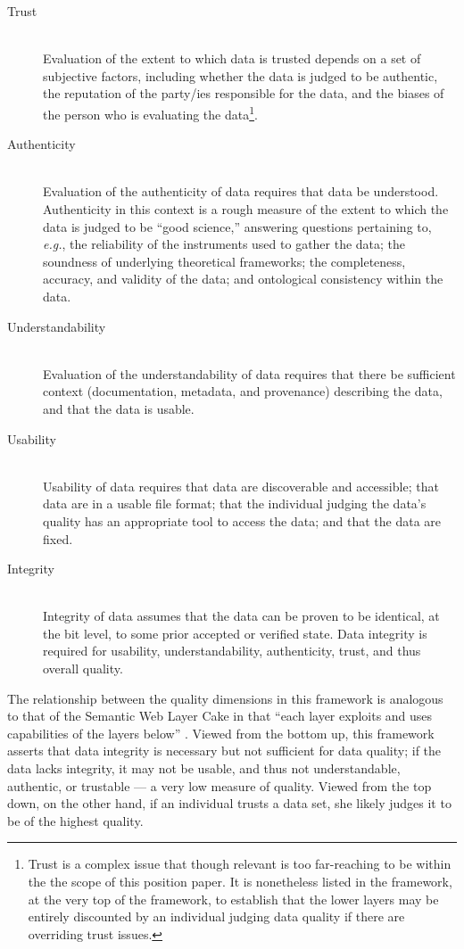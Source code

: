 \documentclass{acm_proc_article-sp}
\begin{document}
\begin{description}
\item[Trust] \hfill \\
  Evaluation of the extent to which data is trusted depends on a set
  of subjective factors, including whether the data is judged to be
  authentic, the reputation of the party/ies responsible for the data,
  and the biases of the person who is evaluating the
  data\footnote{Trust is a complex issue that though relevant is too
    far-reaching to be within the the scope of this position paper. It
    is nonetheless listed in the framework, at the very top of the
    framework, to establish that the lower layers may be entirely
    discounted by an individual judging data quality if there are
    overriding trust issues.}.
\item[Authenticity] \hfill \\
  Evaluation of the authenticity of data requires that data be
  understood. Authenticity in this context is a rough measure of the
  extent to which the data is judged to be ``good science,'' answering
  questions pertaining to, \textit{e.g.}, the reliability of the
  instruments used to gather the data; the soundness of underlying
  theoretical frameworks; the completeness, accuracy, and validity of
  the data; and ontological consistency within the data.
\item[Understandability] \hfill \\
  Evaluation of the understandability of data requires that there be
  sufficient context (documentation, metadata, and provenance)
  describing the data, and that the data is usable.
\item[Usability] \hfill \\
  Usability of data requires that data are discoverable and
  accessible; that data are in a usable file format; that the
  individual judging the data's quality has an appropriate tool to
  access the data; and that the data are fixed.
\item[Integrity] \hfill \\
  Integrity of data assumes that the data can be proven to be
  identical, at the bit level, to some prior accepted or verified
  state. Data integrity is required for usability, understandability,
  authenticity, trust, and thus overall quality.
\end{description}

The relationship between the quality dimensions in this framework is
analogous to that of the Semantic Web Layer Cake in that ``each layer
exploits and uses capabilities of the layers below''
\cite{wiki:semweb}. Viewed from the bottom up, this framework asserts
that data integrity is necessary but not sufficient for data quality;
if the data lacks integrity, it may not be usable, and thus not
understandable, authentic, or trustable --- a very low measure of
quality. Viewed from the top down, on the other hand, if an individual
trusts a data set, she likely judges it to be of the highest quality.
\end{document}

